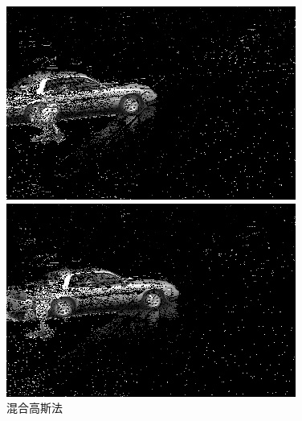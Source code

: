 \documentclass[a4paper]{ctexart}
\begin{document}
\begin{figure}[htbp]
\begin{minipage}[t]{0.2\textwidth}
	\end{minipage}
	\begin{minipage}[t]{0.2\textwidth}
		\centering
		\includegraphics[width=\textwidth]{figure/frames/mixture_of_gaussians_output410.jpg}
	\end{minipage}
	\begin{minipage}[t]{0.2\textwidth}
		\centering
		\includegraphics[width=\textwidth]{figure/frames/mixture_of_gaussians_output415.jpg}
	\end{minipage}
	\caption{混合高斯法}\label{figure:混合高斯法}
\end{figure}
\end{document}
